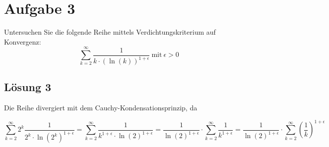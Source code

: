 \section{Aufgabe 3}

Untersuchen Sie die folgende Reihe mittels Verdichtungskriterium auf Konvergenz:
\begin{equation*}
  \sum _{k=2}^{\infty }\frac{1}{k\cdot (\ln( k))^{1+\epsilon }} \ \text{mit} \ \epsilon  >0
\end{equation*}

\subsection{Lösung 3}

Die Reihe divergiert mit dem Cauchy-Kondensationsprinzip, da


\begin{equation*}
  \sum _{k=2}^{\infty } 2^{k}\frac{1}{2^{k} \cdotp \ln\left( 2^{k}\right)^{1+\epsilon }} =\sum _{k=2}^{\infty }\frac{1}{k^{1+\epsilon } \cdotp \ln( 2)^{1+\epsilon }} =\frac{1}{\ln( 2)^{1+\epsilon }} \cdotp \sum _{k=2}^{\infty }\frac{1}{k^{1+\epsilon }} =\frac{1}{\ln( 2)^{1+\epsilon }} \cdotp \sum _{k=2}^{\infty }\left(\frac{1}{k}\right)^{1+\epsilon }
\end{equation*}
